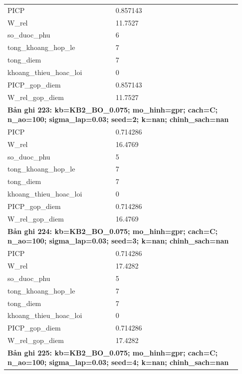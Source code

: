 \begin{longtable}{p{0.43\linewidth}p{0.50\linewidth}}
PICP & 0.857143 \\
W\_\allowbreak rel & 11.7527 \\
so\_\allowbreak duoc\_\allowbreak phu & 6 \\
tong\_\allowbreak khoang\_\allowbreak hop\_\allowbreak le & 7 \\
tong\_\allowbreak diem & 7 \\
khoang\_\allowbreak thieu\_\allowbreak hoac\_\allowbreak loi & 0 \\
PICP\_\allowbreak gop\_\allowbreak diem & 0.857143 \\
W\_\allowbreak rel\_\allowbreak gop\_\allowbreak diem & 11.7527 \\
\midrule
\multicolumn{2}{p{0.95\linewidth}}{\textbf{Bản ghi 223: kb=KB2\_BO\_0.075; mo\_hinh=gpr; cach=C; n\_ao=100; sigma\_lap=0.03; seed=2; k=nan; chinh\_sach=nan}} \\
PICP & 0.714286 \\
W\_\allowbreak rel & 16.4769 \\
so\_\allowbreak duoc\_\allowbreak phu & 5 \\
tong\_\allowbreak khoang\_\allowbreak hop\_\allowbreak le & 7 \\
tong\_\allowbreak diem & 7 \\
khoang\_\allowbreak thieu\_\allowbreak hoac\_\allowbreak loi & 0 \\
PICP\_\allowbreak gop\_\allowbreak diem & 0.714286 \\
W\_\allowbreak rel\_\allowbreak gop\_\allowbreak diem & 16.4769 \\
\midrule
\multicolumn{2}{p{0.95\linewidth}}{\textbf{Bản ghi 224: kb=KB2\_BO\_0.075; mo\_hinh=gpr; cach=C; n\_ao=100; sigma\_lap=0.03; seed=3; k=nan; chinh\_sach=nan}} \\
PICP & 0.714286 \\
W\_\allowbreak rel & 17.4282 \\
so\_\allowbreak duoc\_\allowbreak phu & 5 \\
tong\_\allowbreak khoang\_\allowbreak hop\_\allowbreak le & 7 \\
tong\_\allowbreak diem & 7 \\
khoang\_\allowbreak thieu\_\allowbreak hoac\_\allowbreak loi & 0 \\
PICP\_\allowbreak gop\_\allowbreak diem & 0.714286 \\
W\_\allowbreak rel\_\allowbreak gop\_\allowbreak diem & 17.4282 \\
\midrule
\multicolumn{2}{p{0.95\linewidth}}{\textbf{Bản ghi 225: kb=KB2\_BO\_0.075; mo\_hinh=gpr; cach=C; n\_ao=100; sigma\_lap=0.03; seed=4; k=nan; chinh\_sach=nan}} \\

\end{longtable}
